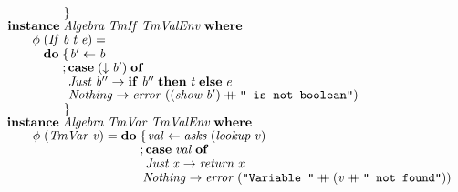 \documentclass[10pt]{article}
\newcommand{\Conid}[1]{\mathit{#1}}
\newcommand{\Varid}[1]{\mathit{#1}}
\newcommand{\plus}{\mathbin{+\!\!\!+}}
\begin{document}
\begin{tabbing}
${\hskip1.00em\relax\hskip2.00em\relax\phantom{\Varid{\phi}\;\mbox{}}\phantom{\mathbf{do}\;\mbox{}}\mskip1.5mu\}}$\\
${}$\\
${\hskip1.00em\relax\mathbf{instance}\;\Conid{Algebra}\;\Conid{TmIf}\;\Conid{TmValEnv}\;\mathbf{where}}$\\
${\hskip1.00em\relax\hskip2.00em\relax\Varid{\phi}\;(\Conid{If}\;\Varid{b}\;\Varid{t}\;\Varid{e})\mathrel{=}}$\\
${\hskip1.00em\relax\hskip2.00em\relax\phantom{\Varid{\phi}\;\mbox{}}\mathbf{do}\;\{\mskip1.5mu \Varid{b'}\leftarrow \Varid{b}}$\\
${\hskip1.00em\relax\hskip2.00em\relax\phantom{\Varid{\phi}\;\mbox{}}\phantom{\mathbf{do}\;\mbox{}};\mathbf{case}\;(\Varid{\downarrow}\;\Varid{b'})\;\mathbf{of}}$\\
${\hskip1.00em\relax\hskip2.00em\relax\phantom{\Varid{\phi}\;\mbox{}}\phantom{\mathbf{do}\;\mbox{}}\phantom{;\mbox{}}\Conid{Just}\;\Varid{b''}\to \mathbf{if}\;\Varid{b''}\;\mathbf{then}\;\Varid{t}\;\mathbf{else}\;\Varid{e}}$\\
${\hskip1.00em\relax\hskip2.00em\relax\phantom{\Varid{\phi}\;\mbox{}}\phantom{\mathbf{do}\;\mbox{}}\phantom{;\mbox{}}\Conid{Nothing}\to \Varid{error}\;((\Varid{show}\;\Varid{b'})\plus \text{\tt \char34 ~is~not~boolean\char34})}$\\
${\hskip1.00em\relax\hskip2.00em\relax\phantom{\Varid{\phi}\;\mbox{}}\phantom{\mathbf{do}\;\mbox{}}\mskip1.5mu\}}$\\
${}$\\
${\hskip1.00em\relax\mathbf{instance}\;\Conid{Algebra}\;\Conid{TmVar}\;\Conid{TmValEnv}\;\mathbf{where}}$\\
${\hskip1.00em\relax\hskip2.00em\relax\Varid{\phi}\;(\Conid{TmVar}\;\Varid{v})\mathrel{=}\mathbf{do}\;\{\mskip1.5mu \Varid{val}\leftarrow \Varid{asks}\;(\Varid{lookup}\;\Varid{v})}$\\
${\hskip1.00em\relax\hskip2.00em\relax\phantom{\Varid{\phi}\;(\Conid{TmVar}\;\Varid{v})\mathrel{=}\mathbf{do}\;\mbox{}};\mathbf{case}\;\Varid{val}\;\mathbf{of}}$\\
${\hskip1.00em\relax\hskip2.00em\relax\phantom{\Varid{\phi}\;(\Conid{TmVar}\;\Varid{v})\mathrel{=}\mathbf{do}\;\mbox{}}\phantom{;\mbox{}}\Conid{Just}\;\Varid{x}\to \Varid{return}\;\Varid{x}}$\\
${\hskip1.00em\relax\hskip2.00em\relax\phantom{\Varid{\phi}\;(\Conid{TmVar}\;\Varid{v})\mathrel{=}\mathbf{do}\;\mbox{}}\phantom{;\mbox{}}\Conid{Nothing}\to \Varid{error}\;(\text{\tt \char34 Variable~\char34}\plus (\Varid{v}\plus \text{\tt \char34 ~not~found\char34}))}$\\

\end{tabbing}
\end{document}
